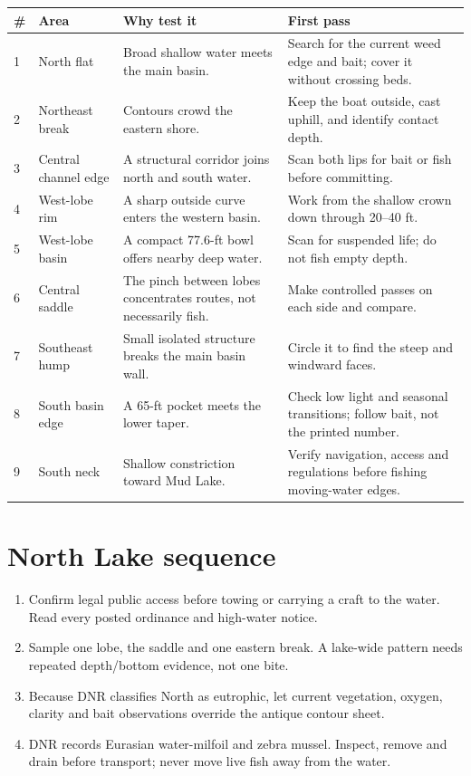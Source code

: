 \begin{longtable}{@{}p{.04\linewidth}p{.19\linewidth}p{.34\linewidth}p{.37\linewidth}@{}}
\toprule
\# & \textbf{Area} & \textbf{Why test it} & \textbf{First pass}\\
\midrule\endhead
1 & North flat & Broad shallow water meets the main basin. &
 Search for the current weed edge and bait; cover it without crossing beds.\\
2 & Northeast break & Contours crowd the eastern shore. &
 Keep the boat outside, cast uphill, and identify contact depth.\\
3 & Central channel edge & A structural corridor joins north and south water. &
 Scan both lips for bait or fish before committing.\\
4 & West-lobe rim & A sharp outside curve enters the western basin. &
 Work from the shallow crown down through 20--40 ft.\\
5 & West-lobe basin & A compact 77.6-ft bowl offers nearby deep water. &
 Scan for suspended life; do not fish empty depth.\\
6 & Central saddle & The pinch between lobes concentrates routes, not
 necessarily fish. & Make controlled passes on each side and compare.\\
7 & Southeast hump & Small isolated structure breaks the main basin wall. &
 Circle it to find the steep and windward faces.\\
8 & South basin edge & A 65-ft pocket meets the lower taper. &
 Check low light and seasonal transitions; follow bait, not the printed number.\\
9 & South neck & Shallow constriction toward Mud Lake. &
 Verify navigation, access and regulations before fishing moving-water edges.\\
\bottomrule
\end{longtable}

\section{North Lake sequence}

\begin{enumerate}
\item Confirm legal public access before towing or carrying a craft to the
water. Read every posted ordinance and high-water notice.
\item Sample one lobe, the saddle and one eastern break. A lake-wide pattern
needs repeated depth/bottom evidence, not one bite.
\item Because DNR classifies North as eutrophic, let current vegetation,
oxygen, clarity and bait observations override the antique contour sheet.
\item DNR records Eurasian water-milfoil and zebra mussel. Inspect, remove and
drain before transport; never move live fish away from the water.
\end{enumerate}

